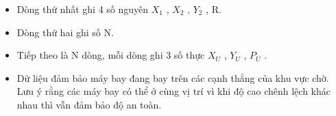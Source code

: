 \begin{itemize}
	\item     Dòng thứ nhất ghi 4 số nguyên $X_{1}$    , $X_{2}$    , $Y_{2}$    , R.   
	\item     Dòng thứ hai ghi số N.   
	\item     Tiếp theo là N dòng, mỗi dòng ghi 3 số thực $X_{U}$    , $Y_{U}$    , $P_{U}$    .   
	\item     Dữ liệu đảm bảo máy bay đang bay trên         các cạnh thẳng        của khu vực chờ. Lưu ý rằng các máy bay có thể ở cùng vị trí vì khi độ cao chênh lệch khác nhau thì vẫn đảm bảo độ an toàn.   
\end{itemize}